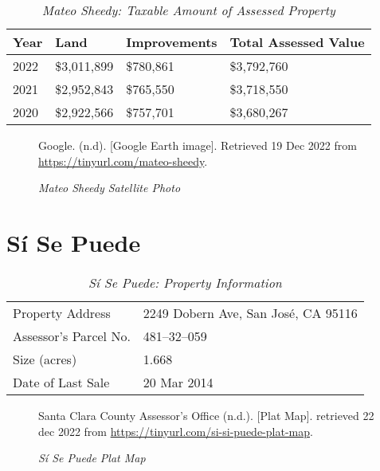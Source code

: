 \begin{table}[hbtp]
  \SingleSpacing%
  \caption[Mateo Sheedy: Taxable Amount of Assessed Propery]{\textit{Mateo Sheedy: Taxable Amount of Assessed Property}}%
  \label{tab:mateo-sheedy-taxable-amount}
  \begin{tabular}{llll}
    \toprule
    Year & Land        & Improvements & Total Assessed Value \\
    \midrule
    2022 & \$3,011,899 & \$780,861    & \$3,792,760 \\
    2021 & \$2,952,843 & \$765,550    & \$3,718,550 \\
    2020 & \$2,922,566 & \$757,701    & \$3,680,267 \\
    \bottomrule
  \end{tabular}
\end{table}

\begin{figure}[hbtp]
  \caption[Mateo Sheedy Satellite Photo]{\textit{Mateo Sheedy Satellite Photo}}%
  \label{fig:mateo-sheedy-sat-photo}
  {Google. (n.d). [Google Earth image]. Retrieved 19 Dec 2022 from \url{https://tinyurl.com/mateo-sheedy}.}
\end{figure}


\clearpage
\section{Sí Se Puede}\label{sec:sí-se-puede-info}\indent

\begin{table}[htbp]
  \SingleSpacing%
  \caption[Sí Se Puede: Property Information]{\textit{Sí Se Puede: Property Information}}\label{tab:sí-se-puede-prop-info}
  \begin{tabular}{ll}
    \toprule
    Property Address      & 2249 Dobern Ave, San José, CA 95116 \\
    Assessor's Parcel No. &  481–32–059 \\
    Size (acres)          &  1.668\\
    Date of Last Sale     &  20 Mar 2014 \\
    \bottomrule
  \end{tabular}
\end{table}

\begin{figure}[hbtp]
  \caption[Sí Se Puede Plat Map]{\textit{Sí Se Puede Plat Map}}%
  \label{fig:sí-se-puede-plat-map}
  {Santa Clara County Assessor's Office (n.d.). [Plat Map]. retrieved 22 dec 2022 from \url{https://tinyurl.com/si-si-puede-plat-map}.}
\end{figure}

